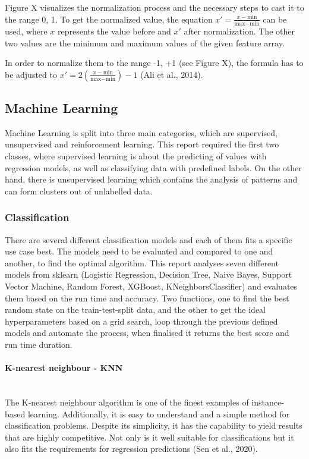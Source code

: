 \documentclass{article}
\begin{document}
\begin{multicols}{2}
Figure X visualizes the normalization process and the necessary steps to cast it to the range 0, 1. To get the normalized value, the equation \(x' = \frac{x - \text{min}}{\text{max} - \text{min}}\) can be used, where \(x\) represents the value before and \(x'\) after normalization. The other two values are the minimum and maximum values of the given feature array.

In order to normalize them to the range -1, +1 (see Figure X), the formula has to be adjusted to \(x' = 2 \left( \frac{x - \text{min}}{\text{max} - \text{min}} \right) - 1\) (Ali et al., 2014).


\subsection{Machine Learning}

Machine Learning is split into three main categories, which are supervised, unsupervised and reinforcement learning. This report required the first two classes, where supervised learning is about the predicting of values with regression models, as well as classifying data with predefined labels. On the other hand, there is unsupervised learning which contains the analysis of patterns and can form clusters out of unlabelled data.

\subsubsection{Classification}

There are several different classification models and each of them fits a specific use case best. 
The models need to be evaluated and compared to one and another, to find the optimal algorithm. This report analyses seven different models from sklearn (Logistic Regression, Decision Tree, Naive Bayes, Support Vector Machine, Random Forest, XGBoost, KNeighborsClassifier) and evaluates them based on the run time and accuracy. 
Two functions, one to find the best random state on the train-test-split data, and the other to get the ideal hyperparameters based on a grid search, loop through the previous defined models and automate the process, when finalised it returns the best score and run time duration.

\paragraph*{\textbf{K-nearest neighbour - KNN}}\mbox{}\\
The K-nearest neighbour algorithm is one of the finest examples of instance-based learning. Additionally, it is easy to understand and a simple method for classification problems. Despite its simplicity, it has the capability to yield results that are highly competitive. Not only is it well suitable for classifications but it also fits the requirements for regression predictions (Sen et al., 2020).


\end{multicols}
\end{document}
